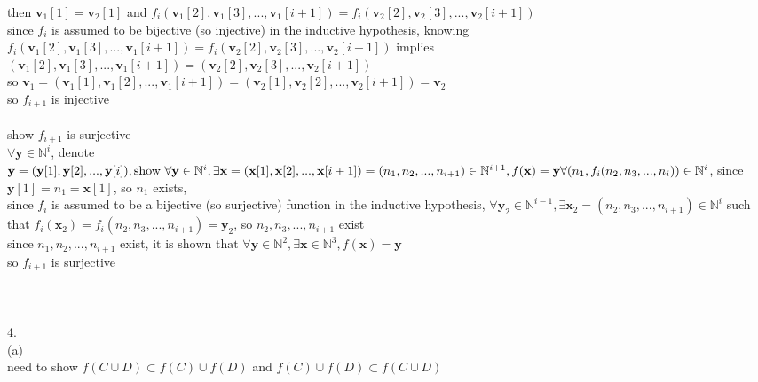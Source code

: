 \documentclass[12pt, border = 4pt, multi]{article} %
\begin{document}
then $\textbf{v}_1[1] = \textbf{v}_2[1]$ and $f_i(\textbf{v}_1[2], \textbf{v}_1[3], ..., \textbf{v}_1[i + 1]) = f_i(\textbf{v}_2[2], \textbf{v}_2[3], ..., \textbf{v}_2[i + 1])$\\
since $f_i$ is assumed to be bijective (so injective) in the inductive hypothesis, knowing $f_i(\textbf{v}_1[2], \textbf{v}_1[3], ..., \textbf{v}_1[i + 1]) = f_i(\textbf{v}_2[2], \textbf{v}_2[3], ..., \textbf{v}_2[i + 1])$ implies $(\textbf{v}_1[2], \textbf{v}_1[3], ..., \textbf{v}_1[i + 1]) = (\textbf{v}_2[2], \textbf{v}_2[3], ..., \textbf{v}_2[i + 1])$\\
so $\textbf{v}_1 = (\textbf{v}_1[1], \textbf{v}_1[2], ..., \textbf{v}_1[i + 1]) = (\textbf{v}_2[1], \textbf{v}_2[2], ..., \textbf{v}_2[i + 1]) = \textbf{v}_2$\\
so $f_{i + 1}$ is injective\\
\\
show $f_{i + 1}$ is surjective\\
$\forall \textbf{y} \in \mathbb{N} ^ i$, denote $\textbf{y} = (\textbf{y}[1], \textbf{y}[2], ..., \textbf{y}[i]),\\
\text{show }\forall \textbf{y} \in \mathbb{N} ^ i, \exists \textbf{x} = (\textbf{x}[1], \textbf{x}[2], ..., \textbf{x}[i + 1]) = (n_1, n_2, ..., n_{i + 1})\in \mathbb{N} ^ {i + 1}, f(\textbf{x}) = \textbf{y}\\
\forall (n_1, f_i(n_2, n_3, ..., n_i)) \in \mathbb{N} ^ i$, since $\textbf{y}[1] = n_1 = \textbf{x}[1]$, so $n_1$ exists,\\
since $f_i$ is assumed to be a bijective (so surjective) function in the inductive hypothesis, $\forall \textbf{y}_2 \in \mathbb{N} ^ {i - 1}, \exists \textbf{x}_2 = (n_2, n_3, ..., n_{i + 1}) \in \mathbb{N} ^ i$ such that $f_i(\textbf{x}_2) = f_i(n_2, n_3, ..., n_{i + 1}) = \textbf{y}_2$, so $n_2, n_3, ..., n_{i + 1}$ exist\\
since $n_1, n_2, ..., n_{i + 1}$ exist, $\text{it is shown that }\forall \textbf{y} \in \mathbb{N} ^ 2, \exists \textbf{x} \in \mathbb{N} ^ 3, f(\textbf{x}) = \textbf{y}$\\
so $f_{i + 1}$ is surjective\\
\\
\\
\\
4.\\
(a)\\
need to show $f(C \cup D) \subset f(C) \cup f(D)$ and $f(C) \cup f(D) \subset f(C \cup D)$\\
\\
\end{document}
